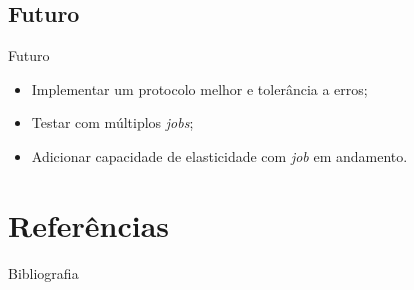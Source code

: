 \documentclass{beamer}
\begin{document}
	\subsection{Futuro}
		\begin{frame}{Futuro}
			\begin{itemize}
				\item Implementar um protocolo melhor e tolerância a erros;
				\item Testar com múltiplos \textit{jobs};
				\item Adicionar capacidade de elasticidade com \textit{job} em andamento.
			\end{itemize}
		\end{frame}

\section{Referências}
	\begin{frame}[allowframebreaks]{Bibliografia}
	 	
		\begin{tiny}
	 		 
	 	\end{tiny}
	\end{frame}
\end{document}
